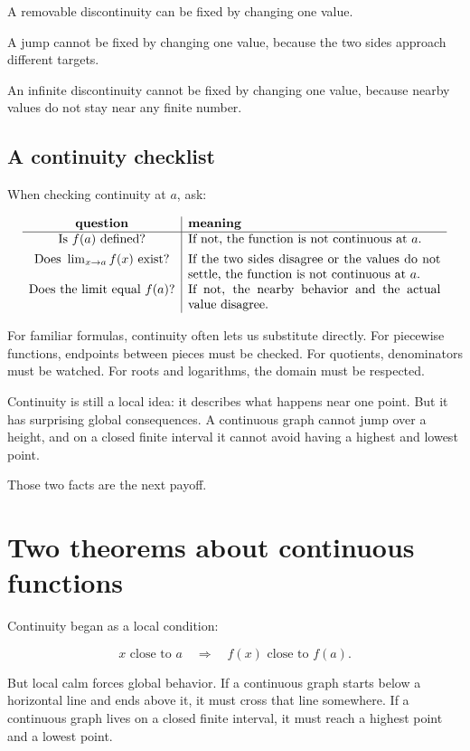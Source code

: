 A removable discontinuity can be fixed by changing one value.

A jump cannot be fixed by changing one value, because the two sides approach different targets.

An infinite discontinuity cannot be fixed by changing one value, because nearby values do not stay near any finite number.

\subsection{A continuity checklist}
\label{subsec:continuity-checklist}

When checking continuity at \(a\), ask:

\[
\begin{array}{c|p{0.58\textwidth}}
\textbf{question} & \textbf{meaning} \\ \hline
\text{Is }f(a)\text{ defined?} &
If not, the function is not continuous at \(a\). \\[4pt]
\text{Does }\lim_{x\to a}f(x)\text{ exist?} &
If the two sides disagree or the values do not settle, the function is not continuous at \(a\). \\[4pt]
\text{Does the limit equal }f(a)\text{?} &
If not, the nearby behavior and the actual value disagree.
\end{array}
\]

For familiar formulas, continuity often lets us substitute directly.  For piecewise functions, endpoints between pieces must be checked.  For quotients, denominators must be watched.  For roots and logarithms, the domain must be respected.

Continuity is still a local idea: it describes what happens near one point.  But it has surprising global consequences.  A continuous graph cannot jump over a height, and on a closed finite interval it cannot avoid having a highest and lowest point.

Those two facts are the next payoff.

\section{Two theorems about continuous functions}
\label{sec:two-theorems-continuous-functions}

Continuity began as a local condition:

\[
x\text{ close to }a
\quad \Longrightarrow \quad
f(x)\text{ close to }f(a).
\]

But local calm forces global behavior.  If a continuous graph starts below a horizontal line and ends above it, it must cross that line somewhere.  If a continuous graph lives on a closed finite interval, it must reach a highest point and a lowest point.

